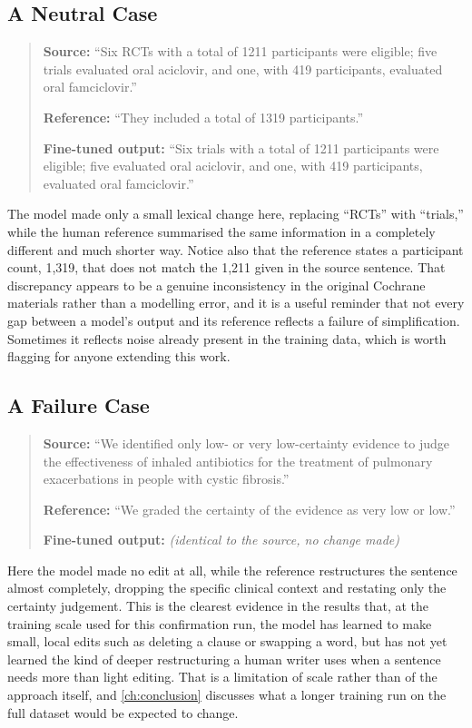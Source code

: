\subsection*{A Neutral Case}

\begin{quote}
\textbf{Source:} ``Six RCTs with a total of 1211 participants were eligible; five trials evaluated oral aciclovir, and one, with 419 participants, evaluated oral famciclovir.''

\textbf{Reference:} ``They included a total of 1319 participants.''

\textbf{Fine-tuned output:} ``Six trials with a total of 1211 participants were eligible; five evaluated oral aciclovir, and one, with 419 participants, evaluated oral famciclovir.''
\end{quote}

The model made only a small lexical change here, replacing ``RCTs'' with ``trials,'' while the human reference summarised the same information in a completely different and much shorter way. Notice also that the reference states a participant count, 1{,}319, that does not match the 1{,}211 given in the source sentence. That discrepancy appears to be a genuine inconsistency in the original Cochrane materials rather than a modelling error, and it is a useful reminder that not every gap between a model's output and its reference reflects a failure of simplification. Sometimes it reflects noise already present in the training data, which is worth flagging for anyone extending this work.

\subsection*{A Failure Case}

\begin{quote}
\textbf{Source:} ``We identified only low- or very low-certainty evidence to judge the effectiveness of inhaled antibiotics for the treatment of pulmonary exacerbations in people with cystic fibrosis.''

\textbf{Reference:} ``We graded the certainty of the evidence as very low or low.''

\textbf{Fine-tuned output:} \textit{(identical to the source, no change made)}
\end{quote}

Here the model made no edit at all, while the reference restructures the sentence almost completely, dropping the specific clinical context and restating only the certainty judgement. This is the clearest evidence in the results that, at the training scale used for this confirmation run, the model has learned to make small, local edits such as deleting a clause or swapping a word, but has not yet learned the kind of deeper restructuring a human writer uses when a sentence needs more than light editing. That is a limitation of scale rather than of the approach itself, and \cref{ch:conclusion} discusses what a longer training run on the full dataset would be expected to change.

